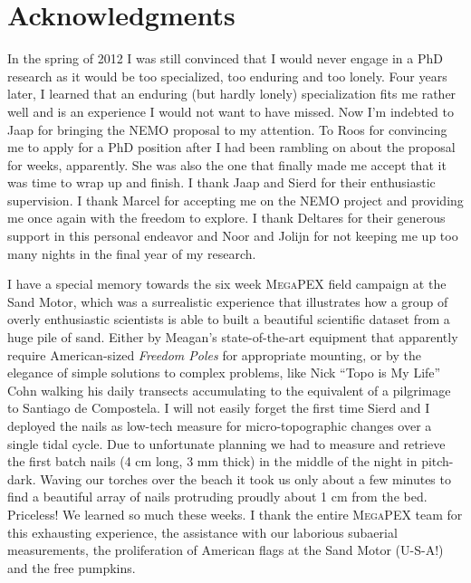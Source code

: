 \chapter*{Acknowledgments}

In the spring of 2012 I was still convinced that I would never engage
in a PhD research as it would be too specialized, too enduring and too
lonely. Four years later, I learned that an enduring (but hardly
lonely) specialization fits me rather well and is an experience I
would not want to have missed. Now I'm indebted to Jaap for bringing
the NEMO proposal to my attention. To Roos for convincing me to apply
for a PhD position after I had been rambling on about the proposal for
weeks, apparently. She was also the one that finally made me accept
that it was time to wrap up and finish. I thank Jaap and Sierd for
their enthusiastic supervision. I thank Marcel for accepting me on the
NEMO project and providing me once again with the freedom to
explore. I thank Deltares for their generous support in this personal
endeavor and Noor and Jolijn for not keeping me up too many nights in
the final year of my research.

I have a special memory towards the six week \textsc{MegaPEX} field
campaign at the Sand Motor, which was a surrealistic experience that
illustrates how a group of overly enthusiastic scientists is able to
built a beautiful scientific dataset from a huge pile of sand. Either
by Meagan's state-of-the-art equipment that apparently require
American-sized \emph{Freedom Poles} for appropriate mounting, or by
the elegance of simple solutions to complex problems, like Nick ``Topo
is My Life'' Cohn walking his daily transects accumulating to the
equivalent of a pilgrimage to Santiago de Compostela. I will not
easily forget the first time Sierd and I deployed the nails as
low-tech measure for micro-topographic changes over a single tidal
cycle. Due to unfortunate planning we had to measure and retrieve the
first batch nails (4 cm long, 3 mm thick) in the middle of the night
in pitch-dark. Waving our torches over the beach it took us only about
a few minutes to find a beautiful array of nails protruding proudly
about 1 cm from the bed. Priceless!  We learned so much these weeks. I
thank the entire \textsc{MegaPEX} team for this exhausting experience,
the assistance with our laborious subaerial measurements, the
proliferation of American flags at the Sand Motor (U-S-A!) and the
free pumpkins.

